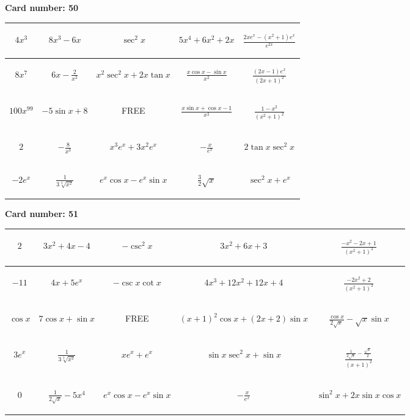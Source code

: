 \documentclass{article}
\newcommand{\entry}[1]{\begin{minipage}[t][2.75cm][t]{4cm} \vspace{1cm} \begin{center}#1\end{center} \end{minipage}}
\newcommand{\freespace}{\entry{FREE}}
\newcommand{\cardnumber}[1]{\noindent \textbf{Card number: #1} \bigskip}
\begin{document}
\pagebreak

\cardnumber{50}
\begin{center}
\begin{tabular}{|*{5}{c|}}
    \hline
    \entry{$4x^3$} & \entry{$8x^3 - 6x$} & \entry{$\sec^2 x$} & \entry{$5x^4 + 6x^2 + 2x$} & \entry{$\frac{2x e^x - (x^2 + 1) e^x}{e^{2x}}$} \\ \hline
    \entry{$8x^7$} & \entry{$6x - \frac{2}{x^2}$} & \entry{$x^2 \sec^2 x + 2x \tan x$} & \entry{$\frac{x \cos x - \sin x}{x^2}$} & \entry{$\frac{(2x - 1) e^x}{(2x + 1)^2}$} \\ \hline
    \entry{$100x^{99}$} & \entry{$-5 \sin x + 8$} & \freespace & \entry{$\frac{x \sin x + \cos x - 1}{x^2}$} & \entry{$\frac{1 - x^2}{(x^2 + 1)^2}$} \\ \hline
    \entry{$2$} & \entry{$-\frac{8}{x^3}$} & \entry{$x^3 e^x + 3x^2 e^x$} & \entry{$-\frac{x}{e^x}$} & \entry{$2 \tan x \sec^2 x$} \\ \hline
    \entry{$-2e^x$} & \entry{$\frac{1}{3\sqrt[3]{x^2}}$} & \entry{$e^x \cos x - e^x \sin x$} & \entry{$\frac{3}{2} \sqrt{x}$} & \entry{$\sec^2 x + e^x$} \\ \hline
\end{tabular}
\end{center}

\pagebreak

\cardnumber{51}
\begin{center}
\begin{tabular}{|*{5}{c|}}
    \hline
    \entry{$2$} & \entry{$3x^2 + 4x - 4$} & \entry{$-\csc^2 x$} & \entry{$3x^2 + 6x + 3$} & \entry{$\frac{-x^2 - 2x + 1}{(x^2 + 1)^2}$} \\ \hline
    \entry{$-11$} & \entry{$4x + 5e^x$} & \entry{$-\csc x \cot x$} & \entry{$4x^3 + 12x^2 + 12x + 4$} & \entry{$\frac{-2x^2 + 2}{(x^2 + 1)^2}$} \\ \hline
    \entry{$\cos x$} & \entry{$7 \cos x + \sin x$} & \freespace & \entry{$(x + 1)^2 \cos x + (2x + 2) \sin x$} & \entry{$\frac{\cos x}{2 \sqrt{x}} - \sqrt{x} \sin x$} \\ \hline
    \entry{$3e^x$} & \entry{$\frac{1}{3\sqrt[3]{x^2}}$} & \entry{$x e^x + e^x$} & \entry{$\sin x \sec^2 x + \sin x$} & \entry{$\frac{\frac{1}{2 \sqrt{x}} - \frac{\sqrt{x}}{2}}{(x + 1)^2}$} \\ \hline
    \entry{$0$} & \entry{$\frac{1}{2\sqrt{x}} - 5x^4$} & \entry{$e^x \cos x - e^x \sin x$} & \entry{$-\frac{x}{e^x}$} & \entry{$\sin^2 x + 2x \sin x \cos x$} \\ \hline
\end{tabular}
\end{center}
\end{document}
